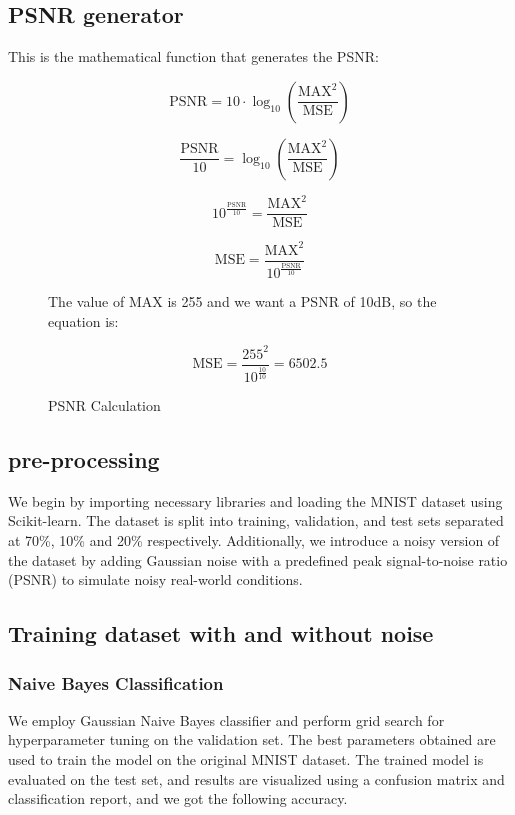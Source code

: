 \documentclass{sbrt}
\begin{document}
\subsection{PSNR generator}

This is the mathematical function that generates the PSNR:

\begin{figure}[H]
    \centering
    \[
    \text{PSNR} = 10 \cdot \log_{10}\left(\frac{\text{MAX}^2}{\text{MSE}}\right)
    \]
    
    \[
    \frac{\text{PSNR}}{10} = \log_{10}\left(\frac{\text{MAX}^2}{\text{MSE}}\right)
    \]
    
    \[
    10^{\frac{\text{PSNR}}{10}} = \frac{\text{MAX}^2}{\text{MSE}}
    \]
    
    \[
    \text{MSE} = \frac{\text{MAX}^2}{10^{\frac{\text{PSNR}}{10}}}
    \]
    
    The value of MAX is 255 and we want a PSNR of 10dB, so the equation is:
    
    \[
    \text{MSE} = \frac{255^2}{10^{\frac{10}{10}}} = 6502.5
    \]
    \caption{PSNR Calculation}
    \label{fig:psnr-calculation}
\end{figure}

\subsection{pre-processing}

We begin by importing necessary libraries and loading the MNIST dataset using Scikit-learn. The dataset is split into training, validation, and test sets separated at 70\%, 10\% and 20\% respectively. Additionally, we introduce a noisy version of the dataset by adding Gaussian noise with a predefined peak signal-to-noise ratio (PSNR) to simulate noisy real-world conditions.

\subsection{Training dataset with and without noise}

\subsubsection{Naive Bayes Classification}

We employ Gaussian Naive Bayes classifier and perform grid search for hyperparameter tuning on the validation set. The best parameters obtained are used to train the model on the original MNIST dataset. The trained model is evaluated on the test set, and results are visualized using a confusion matrix and classification report, and we got the following accuracy.
\end{document}
